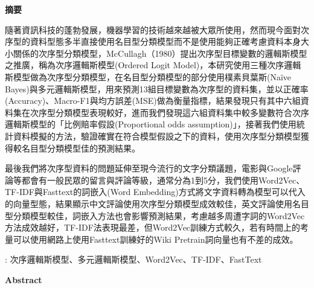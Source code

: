\begin{center} 
{\Large \bf 摘要}\\[20pt]      
\end{center}

   	隨著資訊科技的蓬勃發展，機器學習的技術越來越被大眾所使用，然而現今面對次序型的資料型態多半直接使用名目型分類模型而不是使用能夠正確考慮資料本身大小關係的次序型分類模型，McCullagh（1980）提出次序型目標變數的邏輯斯模型之推廣，稱為次序邏輯斯模型(Ordered Logit Model)，本研究使用三種次序邏輯斯模型做為次序型分類模型，在名目型分類模型的部分使用樸素貝葉斯(Naïve Bayes)與多元邏輯斯模型，用來預測13組目標變數為次序型的資料集，並以正確率(Accuracy)、Macro-F1與均方誤差(MSE)做為衡量指標，結果發現只有其中六組資料集在次序型分類模型表現較好，進而我們發現這六組資料集中較多變數符合次序邏輯斯模型的「比例賠率假設(Proportional odds assumption)」，接著我們使用統計資料模擬的方法，驗證確實在符合模型假設之下的資料，使用次序型分類模型獲得較名目型分類模型佳的預測結果。
   	   	
   	最後我們將次序型資料的問題延伸至現今流行的文字分類議題，電影與Google評論等都會有一般民眾的留言與評論等級，通常分為1到5分，我們使用Word2Vec、TF-IDF與Fasttext的詞嵌入(Word Embedding)方式將文字資料轉為模型可以代入的向量型態，結果顯示中文評論使用次序型分類模型成效較佳，英文評論使用名目型分類模型較佳，詞嵌入方法也會影響預測結果，考慮越多周遭字詞的Word2Vec方法成效越好，TF-IDF法表現最差，但Word2Vec訓練方式較久，若有時間上的考量可以使用網路上使用Fasttext訓練好的Wiki Pretrain詞向量也有不差的成效。
   	
   	
 	

\vspace*{1cm}
: 次序邏輯斯模型、多元邏輯斯模型、Word2Vec、TF-IDF、FastText

\newpage 
\cleardoublepage 
\setlength{\parindent}{2em} 
\thispagestyle{empty}  
\vspace*{1cm} 
\begin{center} 
{\Large \bf Abstract}\\[20pt]      
\end{center}


